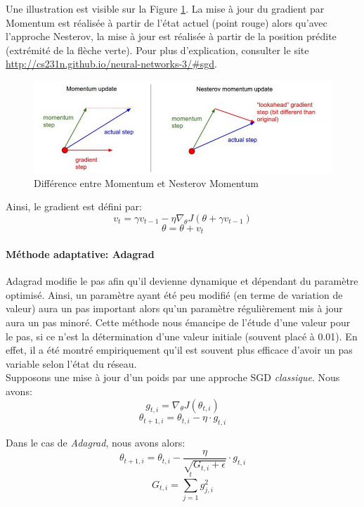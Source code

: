 \noindent Une illustration est visible sur la Figure \ref{nesterovm}. La mise à jour du gradient par Momentum est réalisée à partir de l'état actuel (point rouge) alors qu'avec l'approche Nesterov, la mise à jour est réalisée à partir de la position prédite (extrémité de la flèche verte). Pour plus d'explication, consulter le site \url{http://cs231n.github.io/neural-networks-3/#sgd}.

\begin{figure}
    \centering
    \includegraphics[scale=0.3]{./tex/fondamentaux/nesterov.png}
    \caption{Différence entre Momentum et Nesterov Momentum}
    \label{nesterovm}
\end{figure}

\noindent Ainsi, le gradient est défini par:
$$v_t = \gamma v_{t-1} - \eta \nabla_\theta J( \theta + \gamma v_{t-1} )$$
$$\theta = \theta + v_t $$

\paragraph{Méthode adaptative: Adagrad}
\noindent Adagrad\cite{adagrad} modifie le pas afin qu'il devienne dynamique et dépendant du paramètre optimisé. Ainsi, un paramètre ayant été peu modifié (en terme de variation de valeur) aura un pas important alors qu'un paramètre régulièrement mis à jour aura un pas minoré. Cette méthode nous émancipe de l'étude d'une valeur pour le pas, si ce n'est la détermination d'une valeur initiale (souvent placé à 0.01). En effet, il a été montré empiriquement qu'il est souvent plus efficace d'avoir un pas variable selon l'état du réseau.\\

\noindent Supposons une mise à jour d'un poids par une approche SGD \textit{classique}. Nous avons:
$$g_{t, i} = \nabla_\theta J( \theta_{t, i} )$$
$$\theta_{t+1, i} = \theta_{t, i} - \eta \cdot g_{t, i}$$

\noindent Dans le cas de \textit{Adagrad}, nous avons alors:
$$\theta_{t+1, i} = \theta_{t, i} - \dfrac{\eta}{\sqrt{G_{t, i} + \epsilon}} \cdot g_{t, i}$$
$$G_{t, i}=\sum_{j=1}^t g_{j, i}^2$$

